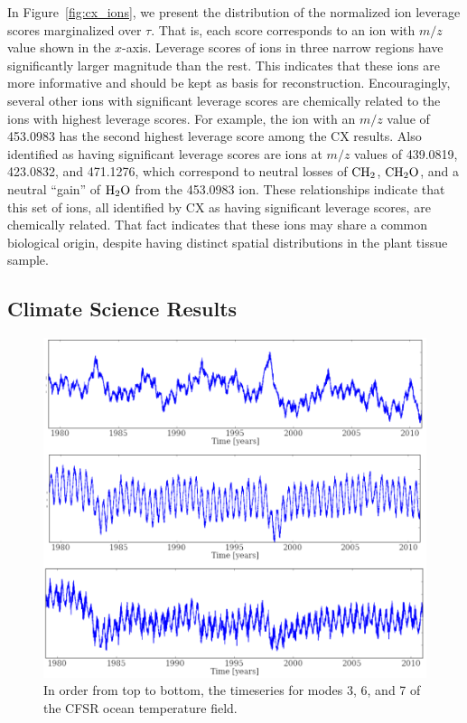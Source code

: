   In Figure~\ref{fig:cx_ions}, we present the distribution of the normalized
  ion leverage scores marginalized over $\tau$. That is, each score corresponds
  to an ion with $m/z$ value shown in the $x$-axis. Leverage scores of ions in
  three narrow regions have significantly larger magnitude than the rest. This
  indicates that these ions are more informative and should be kept as basis
  for reconstruction.  Encouragingly, several other ions with significant
  leverage scores are chemically related to the ions with highest leverage
  scores.  For example, the ion with an $m/z$ value of 453.0983 has the second
  highest leverage score among the CX results.  Also identified as having
  significant leverage scores are ions at $m/z$ values of 439.0819, 423.0832,
  and 471.1276, which correspond to neutral losses of $\rm{CH_2}$,
  $\rm{CH_2O}$, and a neutral ``gain'' of $\rm{H_2O}$ from the 453.0983 ion.
  These relationships indicate that this set of ions, all identified by CX as
  having significant leverage scores, are chemically related.  That fact
  indicates that these ions may share a common biological origin, despite
  having distinct spatial distributions in the plant tissue sample.
  

  \subsection{Climate Science Results}

  \begin{figure}[h!bt]
    \centering
    \includegraphics[width=.9\columnwidth]{images/climate_timeseries.pdf}
    \caption{In order from top to bottom, the timeseries for modes 3, 6, and 7 of the CFSR ocean temperature field.}
        \label{fig:climate_timeseries}
  \end{figure} 

